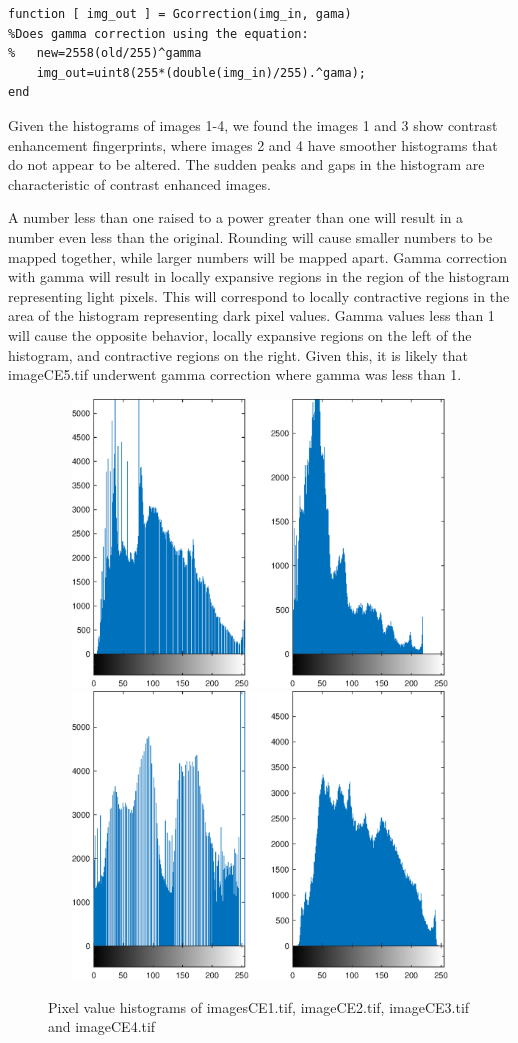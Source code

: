 \documentclass{article}
\begin{document}
\newpage
\begin{lstlisting}
function [ img_out ] = Gcorrection(img_in, gama)
%Does gamma correction using the equation:
%   new=2558(old/255)^gamma
    img_out=uint8(255*(double(img_in)/255).^gama);
end

\end{lstlisting}
    
\qquad Given the histograms of images 1-4, we found the images
1 and 3 show contrast enhancement fingerprints, where images
2 and 4 have smoother histograms that do not appear to be
altered. The sudden peaks and gaps in the histogram are
characteristic of contrast enhanced images.

\qquad A number less than one raised to a power greater than one will
result in a number even less than the original. Rounding will
cause smaller numbers to be mapped together, while larger
numbers will be mapped apart. Gamma correction with gamma will
result in locally expansive regions in the region of the
histogram representing light pixels. This will correspond
to locally contractive regions in the area of the histogram
representing dark pixel values.
Gamma values less than 1 will cause the opposite behavior,
locally expansive regions on the left of the histogram, and
contractive regions on the right.
Given this, it is likely that imageCE5.tif underwent gamma
correction where gamma was less than 1.

\begin{figure}[H]
\centering
\includegraphics [width=5in,height=3in]{lab6_01.eps}
\includegraphics [width=5in,height=3in]{lab6_02.eps}
\caption{Pixel value histograms of imagesCE1.tif, imageCE2.tif,
imageCE3.tif and imageCE4.tif}
\end{figure}
\end{document}
